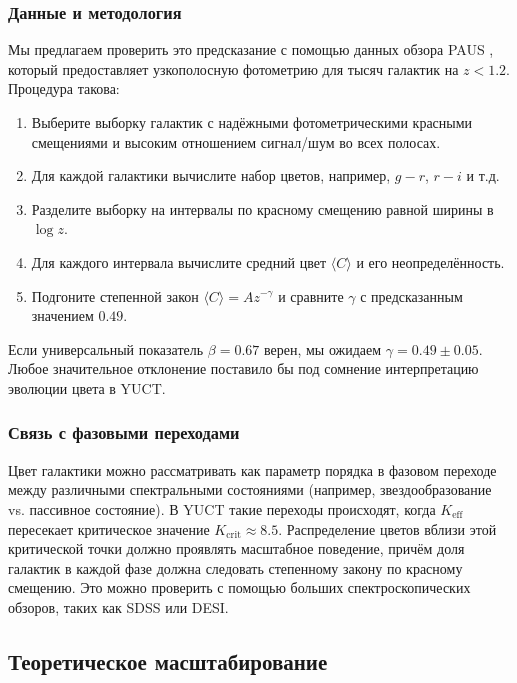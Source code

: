 \documentclass[11pt,a4paper]{article}
\begin{document}
	\subsubsection{Данные и методология}
	
	Мы предлагаем проверить это предсказание с помощью данных обзора PAUS \cite{Alarcon2019}, который предоставляет узкополосную фотометрию для тысяч галактик на \(z < 1.2\). Процедура такова:
	\begin{enumerate}
		\item Выберите выборку галактик с надёжными фотометрическими красными смещениями и высоким отношением сигнал/шум во всех полосах.
		\item Для каждой галактики вычислите набор цветов, например, \(g-r\), \(r-i\) и т.д.
		\item Разделите выборку на интервалы по красному смещению равной ширины в \(\log z\).
		\item Для каждого интервала вычислите средний цвет \(\langle C \rangle\) и его неопределённость.
		\item Подгоните степенной закон \(\langle C \rangle = A z^{-\gamma}\) и сравните \(\gamma\) с предсказанным значением \(0.49\).
	\end{enumerate}
	
	Если универсальный показатель \(\beta = 0.67\) верен, мы ожидаем \(\gamma = 0.49 \pm 0.05\). Любое значительное отклонение поставило бы под сомнение интерпретацию эволюции цвета в YUCT.
	
	\subsubsection{Связь с фазовыми переходами}
	
	Цвет галактики можно рассматривать как параметр порядка в фазовом переходе между различными спектральными состояниями (например, звездообразование vs. пассивное состояние). В YUCT такие переходы происходят, когда \(K_{\mathrm{eff}}\) пересекает критическое значение \(K_{\mathrm{crit}} \approx 8.5\). Распределение цветов вблизи этой критической точки должно проявлять масштабное поведение, причём доля галактик в каждой фазе должна следовать степенному закону по красному смещению. Это можно проверить с помощью больших спектроскопических обзоров, таких как SDSS или DESI.
	
	\subsection{Теоретическое масштабирование}
	
\end{document}
